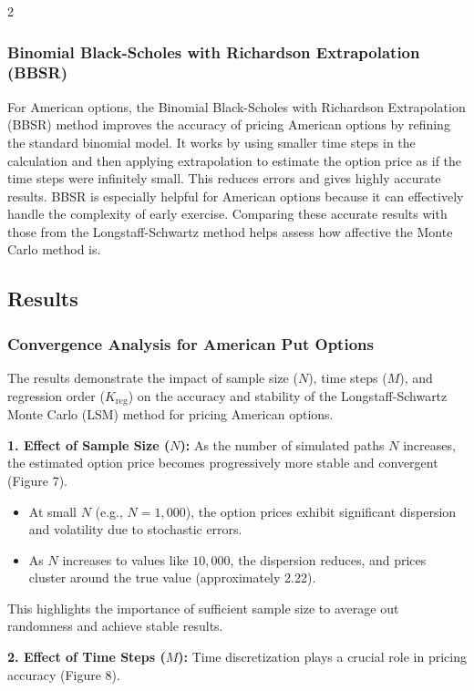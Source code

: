 \begin{multicols}{2}
\subsubsection{Binomial Black-Scholes with Richardson Extrapolation (BBSR)}
For American options, the Binomial Black-Scholes with Richardson Extrapolation (BBSR) method improves the accuracy of pricing American options by refining the standard binomial model. It works by using smaller time steps in the calculation and then applying extrapolation to estimate the option price as if the time steps were infinitely small. This reduces errors and gives highly accurate results. BBSR is especially helpful for American options because it can effectively handle the complexity of early exercise. Comparing these accurate results with those from the Longstaff-Schwartz method helps assess how affective the Monte Carlo method is.
\subsection{Results}

\subsubsection{Convergence Analysis for American Put Options}
The results demonstrate the impact of sample size (\(N\)), time steps (\(M\)), and regression order (\(K_{\text{reg}}\)) on the accuracy and stability of the Longstaff-Schwartz Monte Carlo (LSM) method for pricing American options.

\textbf{1. Effect of Sample Size (\(N\)):}  
As the number of simulated paths \(N\) increases, the estimated option price becomes progressively more stable and convergent (Figure 7).

\begin{itemize}
    \item At small \(N\) (e.g., \(N = 1,000\)), the option prices exhibit significant dispersion and volatility due to stochastic errors.
    \item As \(N\) increases to values like \(10,000\), the dispersion reduces, and prices cluster around the true value (approximately 2.22).
\end{itemize}
This highlights the importance of sufficient sample size to average out randomness and achieve stable results.

\textbf{2. Effect of Time Steps (\(M\)):}  
Time discretization plays a crucial role in pricing accuracy (Figure 8).


\end{multicols}
